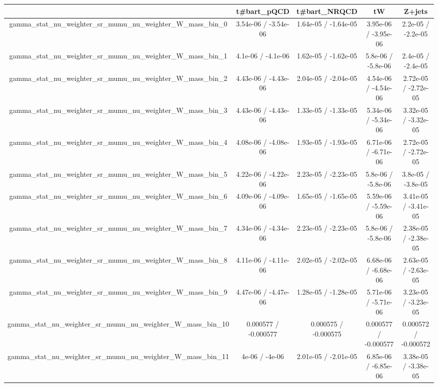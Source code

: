 \documentclass[10pt]{article}
\begin{document}
\begin{table}[htbp]
\begin{center}
\begin{tabular}{|c|c|c|c|c|}
\hline 
      & t#bar{t}_{pQCD}      & t#bar{t}_{NRQCD}      & tW      & Z+jets \\ 
\hline 
  gamma_stat_nu_weighter_sr_mumu_nu_weighter_W_mass_bin_0 & 3.54e-06 / -3.54e-06 & 1.64e-05 / -1.64e-05 & 3.95e-06 / -3.95e-06 & 2.2e-05 / -2.2e-05 \\ 
  gamma_stat_nu_weighter_sr_mumu_nu_weighter_W_mass_bin_1 & 4.1e-06 / -4.1e-06 & 1.62e-05 / -1.62e-05 & 5.8e-06 / -5.8e-06 & 2.4e-05 / -2.4e-05 \\ 
  gamma_stat_nu_weighter_sr_mumu_nu_weighter_W_mass_bin_2 & 4.43e-06 / -4.43e-06 & 2.04e-05 / -2.04e-05 & 4.54e-06 / -4.54e-06 & 2.72e-05 / -2.72e-05 \\ 
  gamma_stat_nu_weighter_sr_mumu_nu_weighter_W_mass_bin_3 & 4.43e-06 / -4.43e-06 & 1.33e-05 / -1.33e-05 & 5.34e-06 / -5.34e-06 & 3.32e-05 / -3.32e-05 \\ 
  gamma_stat_nu_weighter_sr_mumu_nu_weighter_W_mass_bin_4 & 4.08e-06 / -4.08e-06 & 1.93e-05 / -1.93e-05 & 6.71e-06 / -6.71e-06 & 2.72e-05 / -2.72e-05 \\ 
  gamma_stat_nu_weighter_sr_mumu_nu_weighter_W_mass_bin_5 & 4.22e-06 / -4.22e-06 & 2.23e-05 / -2.23e-05 & 5.8e-06 / -5.8e-06 & 3.8e-05 / -3.8e-05 \\ 
  gamma_stat_nu_weighter_sr_mumu_nu_weighter_W_mass_bin_6 & 4.09e-06 / -4.09e-06 & 1.65e-05 / -1.65e-05 & 5.59e-06 / -5.59e-06 & 3.41e-05 / -3.41e-05 \\ 
  gamma_stat_nu_weighter_sr_mumu_nu_weighter_W_mass_bin_7 & 4.34e-06 / -4.34e-06 & 2.23e-05 / -2.23e-05 & 5.8e-06 / -5.8e-06 & 2.38e-05 / -2.38e-05 \\ 
  gamma_stat_nu_weighter_sr_mumu_nu_weighter_W_mass_bin_8 & 4.11e-06 / -4.11e-06 & 2.02e-05 / -2.02e-05 & 6.68e-06 / -6.68e-06 & 2.63e-05 / -2.63e-05 \\ 
  gamma_stat_nu_weighter_sr_mumu_nu_weighter_W_mass_bin_9 & 4.47e-06 / -4.47e-06 & 1.28e-05 / -1.28e-05 & 5.71e-06 / -5.71e-06 & 3.23e-05 / -3.23e-05 \\ 
  gamma_stat_nu_weighter_sr_mumu_nu_weighter_W_mass_bin_10 & 0.000577 / -0.000577 & 0.000575 / -0.000575 & 0.000577 / -0.000577 & 0.000572 / -0.000572 \\ 
  gamma_stat_nu_weighter_sr_mumu_nu_weighter_W_mass_bin_11 & 4e-06 / -4e-06 & 2.01e-05 / -2.01e-05 & 6.85e-06 / -6.85e-06 & 3.38e-05 / -3.38e-05 \\ 

\end{tabular}
\end{center}
\end{table}
\end{document}
